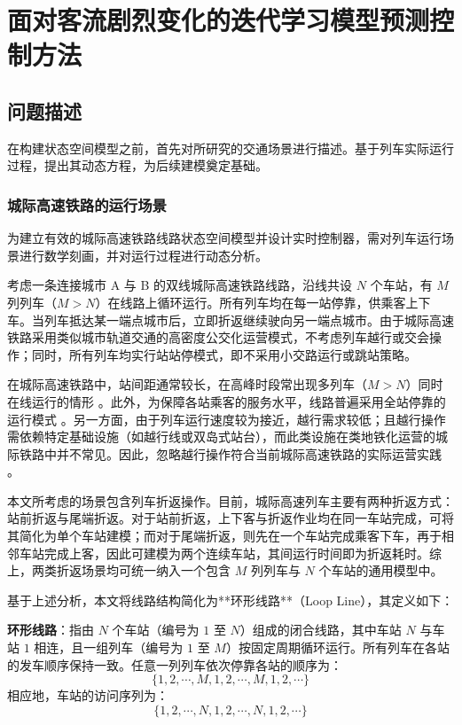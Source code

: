 \chapter{面对客流剧烈变化的迭代学习模型预测控制方法}\label{chap:05}

\setcounter{algorithm}{0} %

\section{问题描述}
\label{section2}

在构建状态空间模型之前，首先对所研究的交通场景进行描述。基于列车实际运行过程，提出其动态方程，为后续建模奠定基础。

\subsection{城际高速铁路的运行场景}

为建立有效的城际高速铁路线路状态空间模型并设计实时控制器，需对列车运行场景进行数学刻画，并对运行过程进行动态分析。

考虑一条连接城市 A 与 B 的双线城际高速铁路线路，沿线共设 $N$ 个车站，有 $M$ 列列车（$M > N$）在线路上循环运行。所有列车均在每一站停靠，供乘客上下车。当列车抵达某一端点城市后，立即折返继续驶向另一端点城市。由于城际高速铁路采用类似城市轨道交通的高密度公交化运营模式，不考虑列车越行或交会操作；同时，所有列车均实行站站停模式，即不采用小交路运行或跳站策略。

在城际高速铁路中，站间距通常较长，在高峰时段常出现多列车（$M > N$）同时在线运行的情形 \cite{Kang2024}。此外，为保障各站乘客的服务水平，线路普遍采用全站停靠的运行模式 \cite{Han2021}。另一方面，由于列车运行速度较为接近，越行需求较低；且越行操作需依赖特定基础设施（如越行线或双岛式站台），而此类设施在类地铁化运营的城际铁路中并不常见。因此，忽略越行操作符合当前城际高速铁路的实际运营实践 \cite{Gupta2016}。

本文所考虑的场景包含列车折返操作。目前，城际高速列车主要有两种折返方式：站前折返与尾端折返。对于站前折返，上下客与折返作业均在同一车站完成，可将其简化为单个车站建模；而对于尾端折返，则先在一个车站完成乘客下车，再于相邻车站完成上客，因此可建模为两个连续车站，其间运行时间即为折返耗时。综上，两类折返场景均可统一纳入一个包含 $M$ 列列车与 $N$ 个车站的通用模型中。

基于上述分析，本文将线路结构简化为**环形线路**（Loop Line），其定义如下：

\textbf{环形线路}：指由 $N$ 个车站（编号为 $1$ 至 $N$）组成的闭合线路，其中车站 $N$ 与车站 $1$ 相连，且一组列车（编号为 $1$ 至 $M$）按固定周期循环运行。所有列车在各站的发车顺序保持一致。任意一列列车依次停靠各站的顺序为：
\begin{equation*}
	\{1,2, \cdots, M, 1,2, \cdots, M, 1,2, \cdots\}
\end{equation*}
相应地，车站的访问序列为：
\begin{equation*}
	\{1,2, \cdots, N, 1,2, \cdots, N, 1,2, \cdots\}
\end{equation*}

